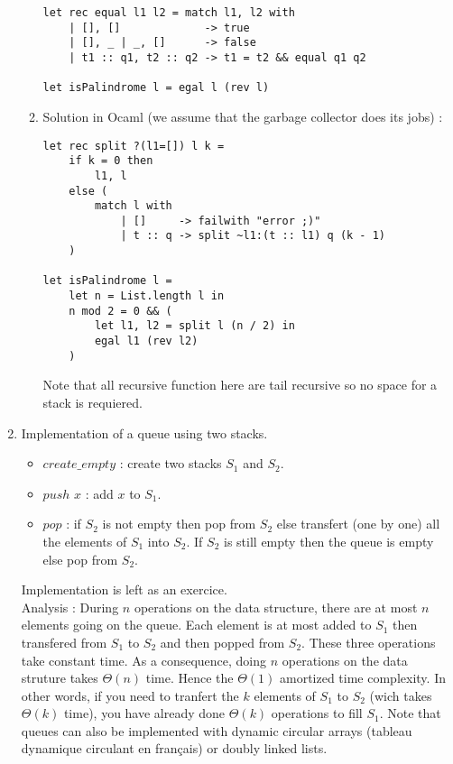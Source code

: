 \documentclass[12pt,4paper]{article}
\newenvironment{code}{%
\begin{mdframed}[linecolor=Green,innerrightmargin=30pt,innerleftmargin=30pt,
backgroundcolor=Black!5,
skipabove=10pt,skipbelow=10pt,roundcorner=5pt,
splitbottomskip=6pt,splittopskip=12pt]
}{%
\end{mdframed}
}
\begin{document}
\begin{enumerate}
\begin{enumerate}
\begin{code}
\begin{verbatim}
let rec equal l1 l2 = match l1, l2 with
    | [], []             -> true
    | [], _ | _, []      -> false
    | t1 :: q1, t2 :: q2 -> t1 = t2 && equal q1 q2

let isPalindrome l = egal l (rev l)
\end{verbatim}
\end{code}

\newpage
\item Solution in Ocaml (we assume that the garbage collector does its jobs) :\\
\begin{code}
\begin{verbatim}
let rec split ?(l1=[]) l k =
    if k = 0 then
        l1, l
    else (
        match l with
            | []     -> failwith "error ;)"
            | t :: q -> split ~l1:(t :: l1) q (k - 1)
    )

let isPalindrome l =
    let n = List.length l in
    n mod 2 = 0 && (
        let l1, l2 = split l (n / 2) in
        egal l1 (rev l2)
    )
\end{verbatim}
\end{code}
Note that all recursive function here are tail recursive so no space for a stack is requiered.

\end{enumerate}
\item Implementation of a queue using two stacks.
\begin{itemize}
\item $create\_empty$ : create two stacks $S_1$ and $S_2$.
\item $push$ $x$ : add $x$ to $S_1$.
\item $pop$ : if $S_2$ is not empty then pop from $S_2$ else transfert (one by
one) all the
elements of $S_1$ into $S_2$. If $S_2$ is still empty then the queue is empty else pop from $S_2$.
\end{itemize}
Implementation is left as an exercice.\\
Analysis : During $n$ operations on the data structure, there are at most $n$
elements going on the queue. Each element is at most added to $S_1$ then
transfered from $S_1$ to $S_2$ and then popped from $S_2$. These three
operations take constant time. As a consequence, doing $n$ operations on the data
struture takes $\Theta(n)$ time. Hence the $\Theta(1)$ amortized time
complexity.
In other words, if you need to tranfert the $k$ elements of $S_1$ to $S_2$
(wich takes $\Theta(k)$ time), you
have already done $\Theta(k)$ operations to fill $S_1$. Note that queues can
also be implemented with dynamic circular arrays (tableau dynamique circulant en
français) or doubly linked lists.



\end{enumerate}
\end{document}
